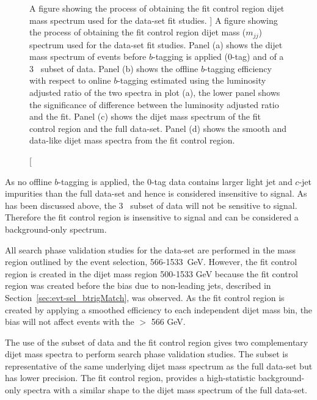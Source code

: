 \begin{figure}[!htb]
{}
\hspace{-2mm}
\vspace{-1em}
\caption
    [A figure showing the process of obtaining the fit control region dijet mass spectrum
      used for the \lm{} data-set fit studies.
    ]
    {\label{fig:fittingCR}
      A figure showing the process of obtaining the fit control region dijet mass ($m_{jj}$) spectrum
      used for the \lm{} data-set fit studies.
      Panel (a) shows the dijet mass spectrum of events before $b$-tagging is applied (0-tag) and of a 3~\ifb{} subset of \lm{} data.
      Panel (b) shows the offline $b$-tagging efficiency with respect to online $b$-tagging estimated using the luminosity adjusted ratio of the two spectra in plot (a),
      the lower panel shows the significance of difference between the luminosity adjusted ratio and the fit.
      Panel (c) shows the dijet mass spectrum of the fit control region and the full \lm{} data-set.
      Panel (d) shows the smooth and data-like dijet mass spectra from the fit control region.
}
\end{figure}

As no offline $b$-tagging is applied,
the 0-tag data contains larger light jet and $c$-jet impurities than the full \lm{} data-set
and hence is considered insensitive to signal.
As has been discussed above, the  3~\ifb{} subset of data will not be sensitive to signal.
Therefore the fit control region is insensitive to signal and can be considered a background-only spectrum.

All search phase validation studies for the \lm{} data-set are performed in the mass region outlined by the \lm{} event selection, 566-1533~GeV.
However, the fit control region is created in the dijet mass region 500-1533 GeV
because the fit control region was created before the bias due to non-leading jets, described in Section~\ref{sec:evt-sel_btrigMatch}, was observed.
As the fit control region is created by applying a smoothed efficiency to each independent dijet mass bin,
the bias will not affect events with the \mjj{} $>$ 566 GeV.

The use of the subset of data and the fit control region gives two complementary dijet mass spectra to perform search phase validation studies.
The subset is representative of the same underlying dijet mass spectrum as the full \lm{} data-set but has lower precision.
The fit control region, provides a high-statistic background-only spectra with a similar shape to the dijet mass spectrum of the full \lm{} data-set.

